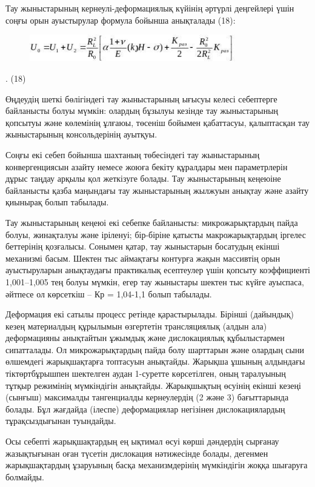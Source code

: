 Тау жыныстарының кернеулі-деформациялық күйінің әртүрлі деңгейлері үшін
соңғы орын ауыстырулар формула бойынша анықталады (18):

\begin{figure}[H]
	\centering
	\includegraphics[width=0.8\textwidth]{assets/1318}
	\caption*{}
\end{figure}. (18)

Өңдеудің шеткі бөлігіндегі тау жыныстарының ығысуы келесі себептерге
байланысты болуы мүмкін: олардың бұзылуы кезінде тау жыныстарының
қопсытуы және көлемінің ұлғаюы, төсеніш бойымен қабаттасуы, қалыптасқан
тау жыныстарының консольдерінің ауытқуы.

Соңғы екі себеп бойынша шахтаның төбесіндегі тау жыныстарының
конвергенциясын азайту немесе жоюға бекіту құралдары мен параметрлерін
дұрыс таңдау арқылы қол жеткізуге болады. Тау жыныстарының кеңеюіне
байланысты қазба маңындағы тау жыныстарының жылжуын анықтау және азайту
қиынырақ болып табылады.

Тау жыныстарының кеңеюі екі себепке байланысты: микрожарықтардың пайда
болуы, жинақталуы және іріленуі; бір-біріне қатысты макрожарықтардың
іргелес беттерінің қозғалысы. Сонымен қатар, тау жыныстарын босатудың
екінші механизмі басым. Шектен тыс аймақтағы контурға жақын массивтің
орын ауыстыруларын анықтаудағы практикалық есептеулер үшін қопсыту
коэффициенті 1,001--1,005 тең болуы мүмкін, егер тау жыныстары шектен
тыс күйге ауыспаса, әйтпесе ол көрсеткіш -- Кр = 1,04-1,1 болып
табылады.

Деформация екі сатылы процесс ретінде қарастырылады. Бірінші (дайындық)
кезең материалдың құрылымын өзгертетін трансляциялық (алдын ала)
деформацияны анықтайтын ұжымдық және дислокациялық құбылыстармен
сипатталады. Ол микрожарықтардың пайда болу шарттарын және олардың сыни
өлшемдегі жарықшақтарға топтасуын анықтайды. Жарықша ұшының алдындағы
тіктөртбұрышпен шектелген аудан 1-суретте көрсетілген, оның таралуының
тұтқыр режимінің мүмкіндігін анықтайды. Жарықшықтың өсуінің екінші
кезеңі (сынғыш) максималды тангенциалды кернеулердің (2 және 3)
бағыттарында болады. Бұл жағдайда (ілеспе) деформациялар негізінен
дислокациялардың тұрақсыздығынан туындайды.

Осы себепті жарықшақтардың ең ықтимал өсуі көрші дәндердің сырғанау
жазықтығынан оған түсетін дислокация нәтижесінде болады, дегенмен
жарықшақтардың ұзаруының басқа механизмдерінің мүмкіндігін жоққа
шығаруға болмайды.

